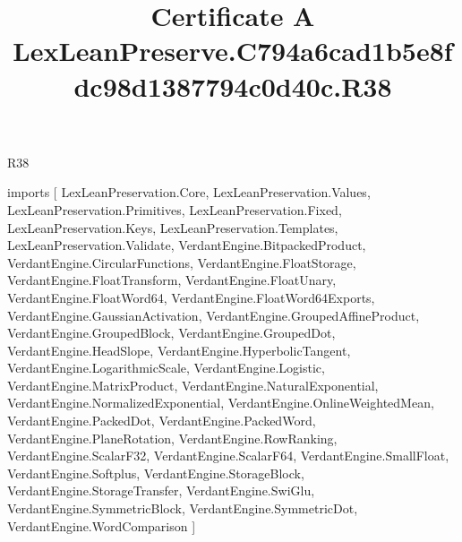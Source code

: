 \begin{lexlean}{R38}
\title{Certificate A LexLeanPreserve.C794a6cad1b5e8fdc98d1387794c0d40c.R38}
\begin{coremodule}
imports [
  LexLeanPreservation.Core,
  LexLeanPreservation.Values,
  LexLeanPreservation.Primitives,
  LexLeanPreservation.Fixed,
  LexLeanPreservation.Keys,
  LexLeanPreservation.Templates,
  LexLeanPreservation.Validate,
  VerdantEngine.BitpackedProduct,
  VerdantEngine.CircularFunctions,
  VerdantEngine.FloatStorage,
  VerdantEngine.FloatTransform,
  VerdantEngine.FloatUnary,
  VerdantEngine.FloatWord64,
  VerdantEngine.FloatWord64Exports,
  VerdantEngine.GaussianActivation,
  VerdantEngine.GroupedAffineProduct,
  VerdantEngine.GroupedBlock,
  VerdantEngine.GroupedDot,
  VerdantEngine.HeadSlope,
  VerdantEngine.HyperbolicTangent,
  VerdantEngine.LogarithmicScale,
  VerdantEngine.Logistic,
  VerdantEngine.MatrixProduct,
  VerdantEngine.NaturalExponential,
  VerdantEngine.NormalizedExponential,
  VerdantEngine.OnlineWeightedMean,
  VerdantEngine.PackedDot,
  VerdantEngine.PackedWord,
  VerdantEngine.PlaneRotation,
  VerdantEngine.RowRanking,
  VerdantEngine.ScalarF32,
  VerdantEngine.ScalarF64,
  VerdantEngine.SmallFloat,
  VerdantEngine.Softplus,
  VerdantEngine.StorageBlock,
  VerdantEngine.StorageTransfer,
  VerdantEngine.SwiGlu,
  VerdantEngine.SymmetricBlock,
  VerdantEngine.SymmetricDot,
  VerdantEngine.WordComparison
]


\end{coremodule}
\end{lexlean}
